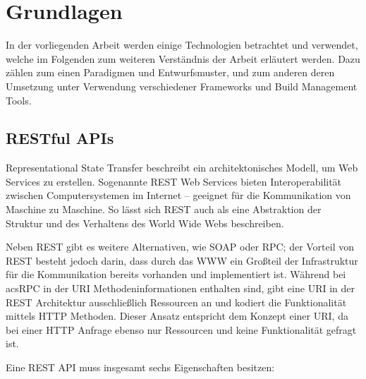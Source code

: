 \chapter{Grundlagen}

	In der vorliegenden Arbeit werden einige Technologien betrachtet und verwendet, welche im Folgenden zum weiteren Verständnis der Arbeit erläutert werden. Dazu zählen zum einen Paradigmen und Entwurfsmuster, und zum anderen deren Umsetzung unter Verwendung verschiedener Frameworks und Build Management Tools. 
	
	\section{RESTful APIs} %
	
		Representational State Transfer beschreibt ein architektonisches Modell, um Web Services zu erstellen. Sogenannte \acs{REST} Web Services bieten Interoperabilität zwischen Computersystemen im Internet -- geeignet für die Kommunikation von Maschine zu Maschine. So lässt sich REST auch als eine Abstraktion der Struktur und des Verhaltens des World Wide Webs beschreiben. 
		
		Neben REST gibt es weitere Alternativen, wie \acs{SOAP} oder \acs{RPC}; der Vorteil von REST besteht jedoch darin, dass durch das \acs{WWW} ein Großteil der Infrastruktur für die Kommunikation bereits vorhanden und implementiert ist. Während bei \\acs{RPC} in der \acs{URI} Methodeninformationen enthalten sind, gibt eine \acs{URI} in der \acs{REST} Architektur ausschließlich Ressourcen an und kodiert die Funktionalität mittels \acs{HTTP} Methoden. Dieser Ansatz entspricht dem Konzept einer \acs{URI}, da bei einer \acs{HTTP} Anfrage ebenso nur Ressourcen und keine Funktionalität gefragt ist.
		
		Eine REST API muss insgesamt sechs Eigenschaften besitzen:
		
